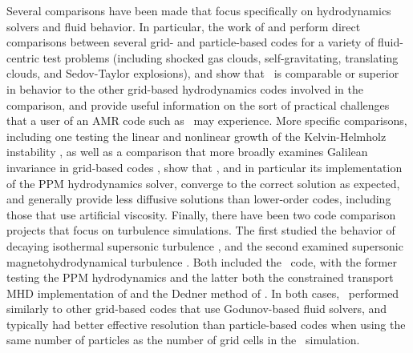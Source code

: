 Several comparisons have been made that focus specifically on
hydrodynamics solvers and fluid behavior.  In particular, the work of
\citet{2007MNRAS.380..963A} and \citet{Tasker2008} perform direct
comparisons between several grid- and particle-based codes for a
variety of fluid-centric test problems (including shocked gas clouds,
self-gravitating, translating clouds, and Sedov-Taylor explosions),
and show that \enzo\ is comparable or superior in behavior to the
other grid-based hydrodynamics codes involved in the comparison, and
provide useful information on the sort of practical challenges that a
user of an AMR code such as \enzo\ may experience.  More specific
comparisons, including one testing the linear and nonlinear growth of
the Kelvin-Helmholz instability \citep{2012ApJS..201...18M}, as well
as a comparison that more broadly examines Galilean invariance in
grid-based codes \citep{2010MNRAS.401.2463R}, show that \enzo, and in
particular its implementation of the PPM hydrodynamics solver,
converge to the correct solution as expected, and generally provide
less diffusive solutions than lower-order codes, including those that
use artificial viscosity.  Finally, there have been two code
comparison projects that focus on turbulence simulations.  The first
studied the behavior of decaying isothermal supersonic turbulence
\citep{2009A&A...508..541K}, and the second examined supersonic
magnetohydrodynamical turbulence \citep{2011ApJ...737...13K}.  Both
included the \enzo\ code, with the former testing the PPM
hydrodynamics and the latter both the constrained transport MHD
implementation of \citet{Collins10} and the Dedner method of
\citet{WangAbelZhang08}.  In both cases, \enzo\ performed similarly to
other grid-based codes that use Godunov-based fluid solvers, and
typically had better effective resolution than particle-based codes
when using the same number of particles as the number of grid cells in
the \enzo\ simulation.

